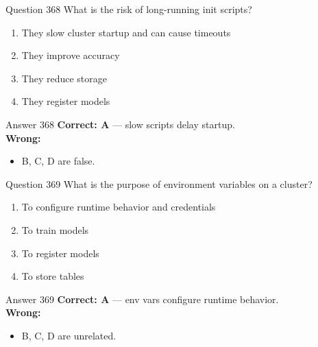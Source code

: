 \documentclass[aspectratio=169,11pt]{beamer}
\begin{document}
	\begin{frame}{Question 368}
		What is the risk of long-running init scripts?
		\begin{enumerate}[label=\Alph*.]
			\item They slow cluster startup and can cause timeouts
			\item They improve accuracy
			\item They reduce storage
			\item They register models
		\end{enumerate}
	\end{frame}
	\begin{frame}{Answer 368}
		\textbf{Correct: A} --- slow scripts delay startup.\\
		\vspace{0.5em}
		\textbf{Wrong:}
		\begin{itemize}
			\item B, C, D are false.
		\end{itemize}
	\end{frame}
	
	\begin{frame}{Question 369}
		What is the purpose of environment variables on a cluster?
		\begin{enumerate}[label=\Alph*.]
			\item To configure runtime behavior and credentials
			\item To train models
			\item To register models
			\item To store tables
		\end{enumerate}
	\end{frame}
	\begin{frame}{Answer 369}
		\textbf{Correct: A} --- env vars configure runtime behavior.\\
		\vspace{0.5em}
		\textbf{Wrong:}
		\begin{itemize}
			\item B, C, D are unrelated.
		\end{itemize}
	\end{frame}
	
\end{document}

